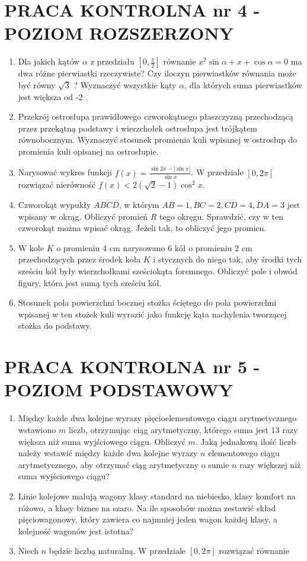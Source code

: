 \documentclass[10pt]{article}
\begin{document}
\section*{PRACA KONTROLNA nr 4 - POZIOM ROZSZERZONY}
\begin{enumerate}
  \item Dla jakich kątów $\alpha$ z przedziału $\left[0, \frac{\pi}{2}\right]$ równanie $x^{2} \sin \alpha+x+\cos \alpha=0$ ma dwa różne pierwiastki rzeczywiste? Czy iloczyn pierwiastków równania może być równy $\sqrt{3}$ ? Wyznaczyć wszystkie kąty $\alpha$, dla których suma pierwiastków jest większa od -2 .
  \item Przekrój ostrosłupa prawidłowego czworokątnego płaszczyzną przechodzącą przez przekątną podstawy i wierzchołek ostrosłupa jest trójkątem równobocznym. Wyznaczyć stosunek promienia kuli wpisanej w ostrosłup do promienia kuli opisanej na ostrosłupie.
  \item Narysować wykres funkcji $f(x)=\frac{\sin 2 x-|\sin x|}{\sin x}$. W przedziale $[0,2 \pi]$ rozwiązać nierówność $f(x)<2(\sqrt{2}-1) \cos ^{2} x$.
  \item Czworokąt wypukły $A B C D$, w którym $A B=1, B C=2, C D=4, D A=3$ jest wpisany w okrąg. Obliczyć promień $R$ tego okręgu. Sprawdzić, czy w ten czworokąt można wpisać okrąg. Jeżeli tak, to obliczyć jego promien.
  \item W kole $K$ o promieniu 4 cm narysowano 6 kół o promieniu 2 cm przechodzących przez środek koła $K$ i stycznych do niego tak, aby środki tych sześciu kół były wierzchołkami sześciokąta foremnego. Obliczyć pole i obwód figury, która jest sumą tych sześciu kół.
  \item Stosunek pola powierzchni bocznej stożka ściętego do pola powierzchni wpisanej w ten stożek kuli wyrazić jako funkcję kąta nachylenia tworzącej stożka do podstawy.
\end{enumerate}

\section*{PRACA KONTROLNA nr 5 - POZIOM PODSTAWOWY}
\begin{enumerate}
  \item Między każde dwa kolejne wyrazy pięcioelementowego ciągu arytmetycznego wstawiono $m$ liczb, otrzymując ciąg arytmetyczny, którego suma jest 13 razy większa niż suma wyjściowego ciągu. Obliczyć $m$. Jaką jednakową ilość liczb należy wstawić między każde dwa kolejne wyrazy $n$ elementowego ciągu arytmetycznego, aby otrzymać ciąg arytmetyczny o sumie $n$ razy większej niż suma wyjściowego ciągu?
  \item Linie kolejowe malują wagony klasy standard na niebiesko, klasy komfort na różowo, a klasy biznes na szaro. Na ile sposobów można zestawić skład pięciowagonowy, który zawiera co najmniej jeden wagon każdej klasy, a kolejność wagonów jest istotna?
  \item Niech $n$ będzie liczbą naturalną. W przedziale $[0,2 \pi]$ rozwiązać równanie
\end{enumerate}
\end{document}
